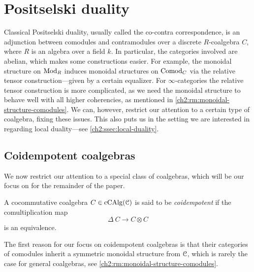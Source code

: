 
\section{Positselski duality}
\label{ch2:sec:positselski-duality}

Classical Positselski duality, usually called the co-contra correspondence, is an adjunction between comodules and contramodules over a discrete $R$-coalgebra $C$, where $R$ is an algebra over a field $k$. In particular, the categories involved are abelian, which makes some constructions easier. For example, the monoidal structure on $\mathrm{Mod}_R$ induces monoidal structures on $\mathrm{Comod}_C$ via the relative tensor construction---given by a certain equalizer. For $\infty$-categories the relative tensor construction is more complicated, as we need the monoidal structure to behave well with all higher coherencies, as mentioned in \cref{ch2:rm:monoidal-structure-comodules}. We can, however, restrict our attention to a certain type of coalgebra, fixing these issues. This also puts us in the setting we are interested in regarding local duality---see \cref{ch2:ssec:local-duality}. 

\subsection{Coidempotent coalgebras}
\label{ch2:ssec:coidempotent-coalgebras}

We now restrict our attention to a special class of coalgebras, which will be our focus on for the remainder of the paper. 

\begin{definition}
    A cocommutative coalgebra $C\in \operatorname{cCAlg}(\EuScript{C})$ is said to be \emph{coidempotent} if the comultiplication map 
    \[\Delta\: C\to C\otimes C\] 
    is an equivalence. 
\end{definition}


The first reason for our focus on coidempotent coalgebras is that their categories of comodules inherit a symmetric monoidal structure from $\EuScript{C}$, which is rarely the case for general coalgebras, see \cref{ch2:rm:monoidal-structure-comodules}. 

